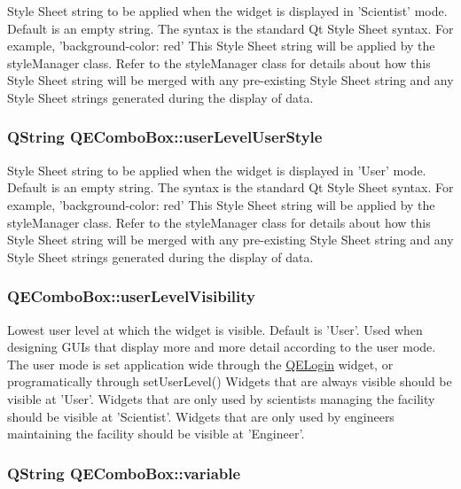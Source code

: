 \label{classQEComboBox_a75af85e06871bc7127e592bc08e26804}
Style Sheet string to be applied when the widget is displayed in 'Scientist' mode. Default is an empty string. The syntax is the standard Qt Style Sheet syntax. For example, 'background-\/color: red' This Style Sheet string will be applied by the styleManager class. Refer to the styleManager class for details about how this Style Sheet string will be merged with any pre-\/existing Style Sheet string and any Style Sheet strings generated during the display of data. \hypertarget{classQEComboBox_ae2ebc0d3d576e06f696110e8395de642}{
\subsubsection[{userLevelUserStyle}]{\setlength{\rightskip}{0pt plus 5cm}QString QEComboBox::userLevelUserStyle}}
\label{classQEComboBox_ae2ebc0d3d576e06f696110e8395de642}
Style Sheet string to be applied when the widget is displayed in 'User' mode. Default is an empty string. The syntax is the standard Qt Style Sheet syntax. For example, 'background-\/color: red' This Style Sheet string will be applied by the styleManager class. Refer to the styleManager class for details about how this Style Sheet string will be merged with any pre-\/existing Style Sheet string and any Style Sheet strings generated during the display of data. \hypertarget{classQEComboBox_a4f08d8c6154291f534153a6c195be8de}{
\subsubsection[{userLevelVisibility}]{ QEComboBox::userLevelVisibility}}
\label{classQEComboBox_a4f08d8c6154291f534153a6c195be8de}
Lowest user level at which the widget is visible. Default is 'User'. Used when designing GUIs that display more and more detail according to the user mode. The user mode is set application wide through the \hyperlink{classQELogin}{QELogin} widget, or programatically through setUserLevel() Widgets that are always visible should be visible at 'User'. Widgets that are only used by scientists managing the facility should be visible at 'Scientist'. Widgets that are only used by engineers maintaining the facility should be visible at 'Engineer'. \hypertarget{classQEComboBox_a6a0aa7f7d106b8133ea2711a9b93044c}{
\subsubsection[{variable}]{\setlength{\rightskip}{0pt plus 5cm}QString QEComboBox::variable}}
